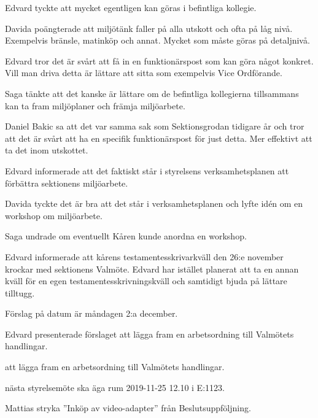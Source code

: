 \documentclass[10pt]{article}
\begin{document}
\begin{paragrafer}
Edvard tyckte att mycket egentligen kan göras i befintliga kollegie.

Davida poängterade att miljötänk faller på alla utskott och ofta på låg nivå. Exempelvis bränsle, matinköp och annat. Mycket som måste göras på detaljnivå.

Edvard tror det är svårt att få in en funktionärspost som kan göra något konkret. Vill man driva detta är lättare att sitta som exempelvis Vice Ordförande. 

Saga tänkte att det kanske är lättare om de befintliga kollegierna tillsammans kan ta fram miljöplaner och främja miljöarbete. 

Daniel Bakic sa att det var samma sak som Sektionsgrodan tidigare år och tror att det är svårt att ha en specifik funktionärspost för just detta. Mer effektivt att ta det inom utskottet. 

Edvard informerade att det faktiskt står i styrelsens verksamhetsplanen att förbättra sektionens miljöarbete.

Davida tyckte det är bra att det står i verksamhetsplanen och lyfte idén om en workshop om miljöarbete. 

Saga undrade om eventuellt Kåren kunde anordna en workshop. 


Edvard informerade att kårens testamentesskrivarkväll den 26:e november krockar med sektionens Valmöte. Edvard har istället planerat att ta en annan kväll för en egen testamentesskrivningskväll och samtidigt bjuda på lättare tilltugg. 

Förslag på datum är måndagen 2:a december.


Edvard presenterade förslaget att lägga fram en arbetsordning till Valmötets handlingar. 

\Mba att lägga fram en arbetsordning till Valmötets handlingar. 

\Mba nästa styrelsemöte ska äga rum 2019-11-25 12.10 i E:1123.

Mattias \ypa stryka ''Inköp av video-adapter'' från Beslutsuppföljning.

\Mbaby


\end{paragrafer}
\end{document}

